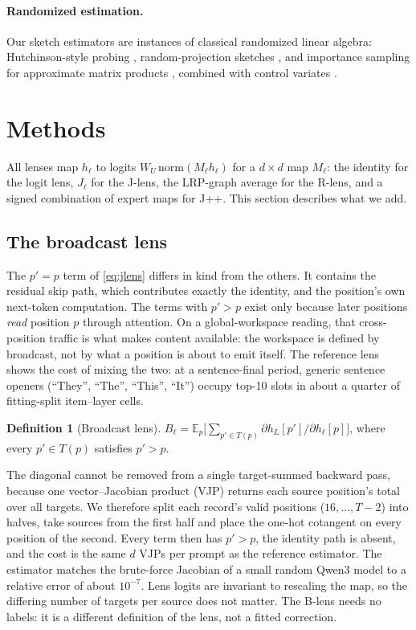 \documentclass[11pt]{article}
\theoremstyle{definition}
\newtheorem{definition}{Definition}
\newcommand{\E}{\mathbb{E}}
\newcommand{\Jl}{J_{\ell}}
\begin{document}
\paragraph{Randomized estimation.}
Our sketch estimators are instances of classical randomized linear algebra: Hutchinson-style
probing \citep{hutchinson1989}, random-projection sketches \citep{halko2011,martinsson2020}, and
importance sampling for approximate matrix products \citep{drineas2006}, combined with control
variates \citep{owen2013}.

\section{Methods}
\label{sec:methods}

All lenses map $h_\ell$ to logits $W_U\,\mathrm{norm}(M_\ell h_\ell)$ for a $d\times d$ map
$M_\ell$: the identity for the logit lens, $\Jl$ for the J-lens, the LRP-graph average for the R-lens,
and a signed combination of expert maps for J++. This section describes what we add.

\subsection{The broadcast lens}
\label{sec:broadcast}

The $p'=p$ term of \cref{eq:jlens} differs in kind from the others. It contains the residual skip
path, which contributes exactly the identity, and the position's own next-token computation. The
terms with $p'>p$ exist only because later positions \emph{read} position $p$ through attention. On a
global-workspace reading, that cross-position traffic is what makes content available: the workspace
is defined by broadcast, not by what a position is about to emit itself. The reference lens shows
the cost of mixing the two: at a sentence-final period, generic sentence openers (``They'', ``The'',
``This'', ``It'') occupy top-10 slots in about a quarter of fitting-split item--layer cells.

\begin{definition}[Broadcast lens]
$B_\ell = \E_p\big[\sum_{p'\in T(p)} \partial h_L[p'] / \partial h_\ell[p]\big]$, where every
$p'\in T(p)$ satisfies $p'>p$.
\end{definition}

The diagonal cannot be removed from a single target-summed backward pass, because one vector--Jacobian
product (VJP) returns each source position's total over all targets. We therefore split each
record's valid positions ($16,\dots,T-2$) into halves, take sources from the first half and place the
one-hot cotangent on every position of the second. Every term then has $p'>p$, the identity path is
absent, and the cost is the same $d$ VJPs per prompt as the reference estimator. The estimator matches
the brute-force Jacobian of a small random Qwen3 model to a relative error of about $10^{-7}$. Lens
logits are invariant to rescaling the map, so the differing number of targets per source does not
matter. The B-lens needs no labels: it is a different definition of the lens, not a fitted correction.
\end{document}
